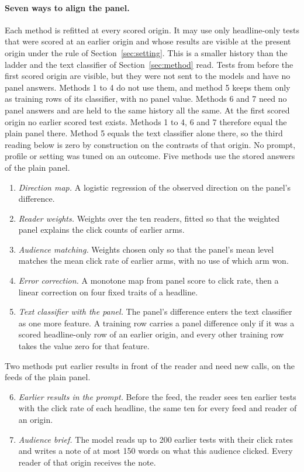 \paragraph{Seven ways to align the panel.} Each method is refitted at every scored origin. It may use only headline-only tests that were scored at an earlier origin and whose results are visible at the present origin under the rule of Section~\ref{sec:setting}. This is a smaller history than the ladder and the text classifier of Section~\ref{sec:method} read. Tests from before the first scored origin are visible, but they were not sent to the models and have no panel answers. Methods 1 to 4 do not use them, and method 5 keeps them only as training rows of its classifier, with no panel value. Methods 6 and 7 need no panel answers and are held to the same history all the same. At the first scored origin no earlier scored test exists. Methods 1 to 4, 6 and 7 therefore equal the plain panel there. Method 5 equals the text classifier alone there, so the third reading below is zero by construction on the contrasts of that origin. No prompt, profile or setting was tuned on an outcome. Five methods use the stored answers of the plain panel.
\begin{enumerate}
\item \emph{Direction map.} A logistic regression of the observed direction on the panel's difference.
\item \emph{Reader weights.} Weights over the ten readers, fitted so that the weighted panel explains the click counts of earlier arms.
\item \emph{Audience matching.} Weights chosen only so that the panel's mean level matches the mean click rate of earlier arms, with no use of which arm won.
\item \emph{Error correction.} A monotone map from panel score to click rate, then a linear correction on four fixed traits of a headline.
\item \emph{Text classifier with the panel.} The panel's difference enters the text classifier as one more feature. A training row carries a panel difference only if it was a scored headline-only row of an earlier origin, and every other training row takes the value zero for that feature.
\end{enumerate}
Two methods put earlier results in front of the reader and need new calls, on the feeds of the plain panel.
\begin{enumerate}\setcounter{enumi}{5}
\item \emph{Earlier results in the prompt.} Before the feed, the reader sees ten earlier tests with the click rate of each headline, the same ten for every feed and reader of an origin.
\item \emph{Audience brief.} The model reads up to 200 earlier tests with their click rates and writes a note of at most 150 words on what this audience clicked. Every reader of that origin receives the note.
\end{enumerate}

